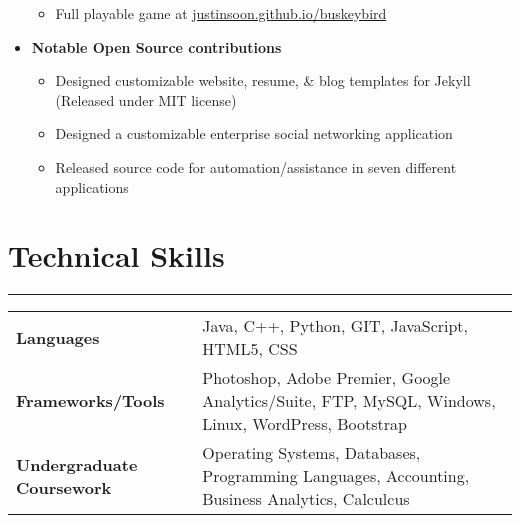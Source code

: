 \documentclass[a4paper]{article}
\begin{document}
\begin{itemize}
\begin{itemize}
		\item Full playable game at \href{http://justinsoon.github.io/BuskeyBird/}{justinsoon.github.io/buskeybird}
	      \end{itemize}
	\item
	      \textbf{Notable Open Source contributions}
	      \begin{itemize}
	      	\vspace{-2mm} \setlength\itemsep{-0.7mm}
	      	\item Designed customizable website, resume, \& blog templates for Jekyll (Released under MIT license)
	      	\item Designed a customizable enterprise social networking application
	      	\item Released source code for automation/assistance in seven different applications
	      \end{itemize}
\end{itemize}

\section*{Technical Skills}
\hrule
\vspace{3mm}
\begin{tabular}{@{}m{40mm}m{130mm}@{}}
	\textbf{\textrm{Languages}}        & Java, C++, Python, GIT, JavaScript, HTML5, CSS\\
	\textbf{\textrm{Frameworks/Tools}} & Photoshop, Adobe Premier, Google Analytics/Suite, FTP, MySQL, Windows, Linux, WordPress, Bootstrap\\
	\textbf{\textrm{Undergraduate Coursework}} & Operating Systems, Databases, Programming Languages, Accounting, Business Analytics, Calculcus\\
\end{tabular}

\end{document}
